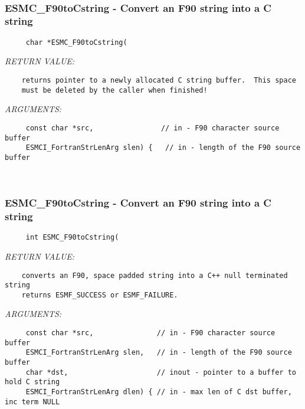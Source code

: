  
\mbox{}\hrulefill\
 
\subsubsection [ESMC\_F90toCstring] {ESMC\_F90toCstring - Convert an F90 string into a C string}


  
\begin{verbatim}     char *ESMC_F90toCstring(\end{verbatim}{\em RETURN VALUE:}
\begin{verbatim}    returns pointer to a newly allocated C string buffer.  This space
    must be deleted by the caller when finished!\end{verbatim}{\em ARGUMENTS:}
\begin{verbatim}     const char *src,                // in - F90 character source buffer
     ESMCI_FortranStrLenArg slen) {   // in - length of the F90 source buffer\end{verbatim}
 
 
\mbox{}\hrulefill\
 
\subsubsection [ESMC\_F90toCstring] {ESMC\_F90toCstring - Convert an F90 string into a C string}


  
\begin{verbatim}     int ESMC_F90toCstring(\end{verbatim}{\em RETURN VALUE:}
\begin{verbatim}    converts an F90, space padded string into a C++ null terminated string
    returns ESMF_SUCCESS or ESMF_FAILURE.\end{verbatim}{\em ARGUMENTS:}
\begin{verbatim}     const char *src,               // in - F90 character source buffer
     ESMCI_FortranStrLenArg slen,   // in - length of the F90 source buffer
     char *dst,                     // inout - pointer to a buffer to hold C string
     ESMCI_FortranStrLenArg dlen) { // in - max len of C dst buffer, inc term NULL\end{verbatim}
 
